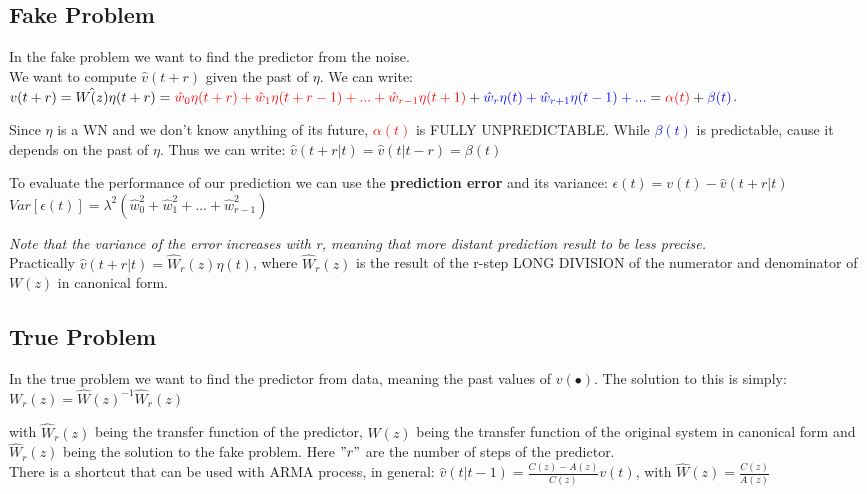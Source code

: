 \documentclass[10pt,a4paper]{article}
\begin{document}
\subsection{Fake Problem}
In the fake problem we want to find the predictor from the noise. \\
We want to compute $\hat{v}(t+r)$ given the past of $\eta$. We can write: \center 
$v(t+r)=\hat{W(z)}\eta(t+r)=\textcolor{red}{\hat{w}_0\eta(t+r)+\hat{w}_1\eta(t+r-1)+...+\hat{w}_{r-1}\eta(t+1)}+\textcolor{blue}{\hat{w}_r\eta(t)+\hat{w}_{r+1}\eta(t-1)+...}=\textcolor{red}{\alpha(t)}+\textcolor{blue}{\beta(t)}$.
\\ \raggedright \vspace{0.5em}
Since $\eta$ is a WN and we don't know anything of its future, \textcolor{red}{$\alpha(t)$} is FULLY UNPREDICTABLE. While \textcolor{blue}{$\beta(t)$} is predictable, cause it depends on the past of $\eta$. Thus we can write:
\center 
$\hat{v}(t+r|t)=\hat{v}(t|t-r)=\beta(t)$
\\ \raggedright \vspace{0.5em}
To evaluate the performance of our prediction we can use the \textbf{prediction error} and its variance:
\center
$\epsilon(t)=v(t)-\hat{v}(t+r|t)$ \\
$Var[\epsilon(t)]=\lambda^2(\hat{w}_0^2+\hat{w}_1^2+...+\hat{w}_{r-1}^2)$
\\ \raggedright \vspace{0.5em}
\textit{Note that the variance of the error increases with r, meaning that more distant prediction result to be less precise.} \\
Practically $\hat{v}(t+r|t)=\hat{W}_r(z)\eta(t)$, where $\hat{W}_r(z)$ is the result of the r-step LONG DIVISION of the numerator and denominator of $W(z)$ in canonical form.
\subsection{True Problem}
In the true problem we want to find the predictor from data, meaning the past values of $v(\bullet)$. The solution to this is simply:
\center $W_r(z)=\hat{W}(z)^{-1}\hat{W}_r(z)$
\\ \raggedright \vspace{0.5em}
with $\hat{W}_r(z)$ being the transfer function of the predictor, $W(z)$ being the transfer function of the original system in canonical form and $\hat{W}_r(z)$ being the solution to the fake problem. Here $"r"$ are the number of steps of the predictor. \\ 
There is a shortcut that can be used with ARMA process, in general:
\center
	$\hat{v}(t|t-1)=\frac{C(z)-A(z)}{C(z)}v(t)$, with $\hat{W}(z)=\frac{C(z)}{A(z)}$
\\ \raggedright
\end{document}
